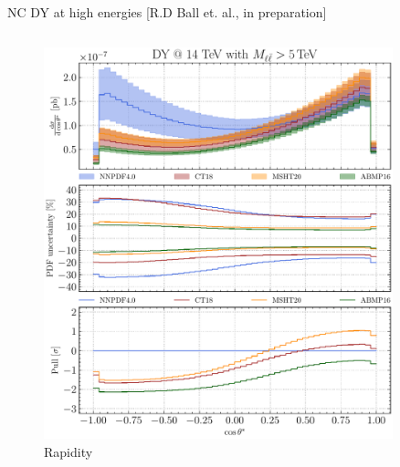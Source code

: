 \documentclass[aspectratio=169,9pt]{beamer}
\begin{document}
\begin{frame}{NC DY at high energies [R.D Ball et. al., in preparation]}
    \vspace*{-3em}
    \begin{columns}
        \begin{column}{0.66\textwidth}
            \begin{column}{0.5\textwidth}
                \begin{figure}
                    \includegraphics[width=0.9\textwidth]{CMS_DY_14TEV_MLL_5000_COSTH}
                    \caption*{Rapidity}
                \end{figure}
            \end{column}
            \begin{column}{0.5\textwidth}
                \begin{figure}

\end{figure}
\end{column}
\end{column}
\end{columns}
\end{frame}
\end{document}

